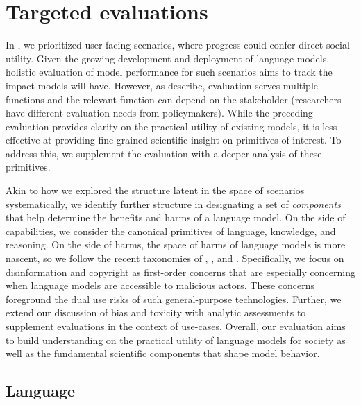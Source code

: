 \hypertarget{targeted}{\section{Targeted evaluations}}
\label{sec:targeted-evaluations}
In , we prioritized user-facing scenarios, where progress could confer direct social utility. 
Given the growing development and deployment of language models, holistic evaluation of model performance for such scenarios aims to track the impact models will have.
However, as \citet[][\S4.4]{bommasani2021opportunities} describe, evaluation serves multiple functions and the relevant function can depend on the stakeholder (\eg researchers have different evaluation needs from policymakers).
While the preceding evaluation provides clarity on the practical utility of existing models, it is less effective at providing fine-grained scientific insight on primitives of interest.
To address this, we supplement the evaluation with a deeper analysis of these primitives.

Akin to how we explored the structure latent in the space of scenarios systematically, we identify further structure in designating a set of \textit{components} that help determine the benefits and harms of a language model.
On the side of capabilities, we consider the canonical primitives of language, knowledge, and reasoning.
On the side of harms, the space of harms of language models is more nascent, so we follow the recent taxonomies of \citet[][\S5]{bommasani2021opportunities}, \citet{weidinger2022taxonomy}, \citet{bender2021dangers} and \citet{rauh2022characteristics}.
Specifically, we focus on disinformation and copyright as first-order concerns that are especially concerning when language models are accessible to malicious actors.
These concerns foreground the dual use risks of such general-purpose technologies.
Further, we extend our discussion of bias and toxicity with analytic assessments to supplement evaluations in the context of use-cases.
Overall, our evaluation aims to build understanding on the practical utility of language models for society as well as the fundamental scientific components that shape model behavior.

\hypertarget{language}{\subsection{Language}}
\label{sec:language}

